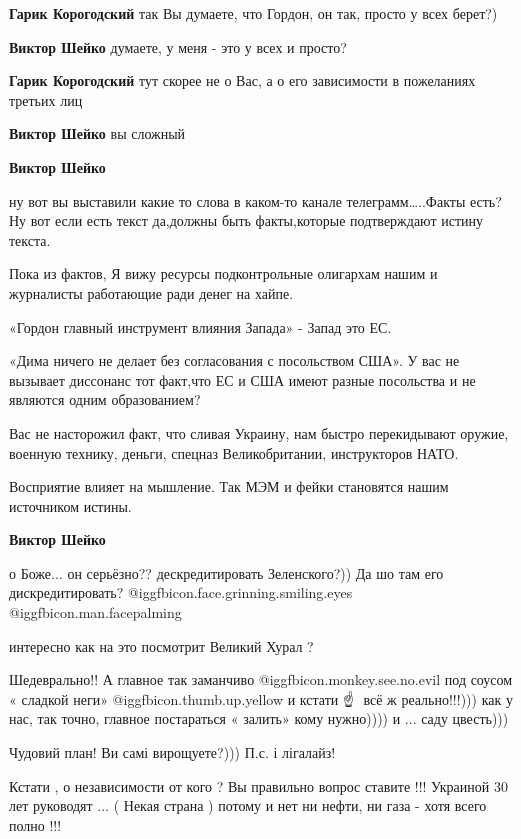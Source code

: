 \begin{itemize}
\begin{itemize}
\textbf{Гарик Корогодский} так Вы думаете, что Гордон, он так, просто у всех берет?)

\textbf{Виктор Шейко} думаете, у меня - это у всех и просто?

\textbf{Гарик Корогодский} тут скорее не о Вас, а о его зависимости в пожеланиях третьих лиц

\textbf{Виктор Шейко} вы сложный

\textbf{Виктор Шейко} 

ну вот вы выставили какие то слова в каком-то канале телеграмм…..Факты есть? Ну
вот если есть текст да,должны быть факты,которые подтверждают истину текста.

Пока из фактов, Я вижу ресурсы подконтрольные олигархам нашим и журналисты
работающие ради денег на хайпе.

«Гордон главный инструмент влияния Запада» - Запад это ЕС.

«Дима ничего не делает без согласования с посольством США». У вас не вызывает
диссонанс тот факт,что ЕС и США имеют разные посольства и не являются одним
образованием?

Вас не насторожил факт, что сливая Украину, нам быстро перекидывают оружие,
военную технику, деньги, спецназ Великобритании, инструкторов НАТО.🤷

Восприятие влияет на мышление.
Так МЭМ и фейки становятся нашим источником истины.

\textbf{Виктор Шейко} 

о Боже... он серьёзно?? дескредитировать Зеленского?)) Да шо там его
дискредитировать? @igg{fbicon.face.grinning.smiling.eyes}
@igg{fbicon.man.facepalming} 

интересно как на это посмотрит Великий Хурал ?
\end{itemize} %


Шедеврально!! А главное так заманчиво @igg{fbicon.monkey.see.no.evil} под соусом « сладкой неги»  @igg{fbicon.thumb.up.yellow} и
кстати ☝ ️ всё ж реально!!!))) как у нас, так точно, главное постараться « залить»
кому нужно)))) и ... саду цвесть)))


Чудовий план! Ви самі вирощуете?))) П.с. і лігалайз!


Кстати , о независимости от кого ? Вы правильно вопрос ставите !!! Украиной 30
лет руководят ... ( Некая страна ) потому и нет ни нефти, ни газа - хотя всего
полно !!!


\end{itemize}
